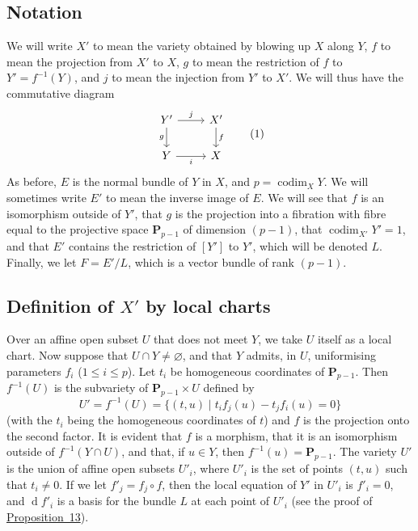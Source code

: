 \documentclass{article}
\newcommand{\PP}{\mathbf{P}}
\newcommand{\dd}{\operatorname{d}\!}
\renewcommand{\leq}{\leqslant}
\DeclareMathOperator{\codim}{codim}
\newcommand{\oldpage}[1]{\marginpar{\footnotesize$\Big\vert$ \textit{p.~#1}}}
\begin{document}
\subsection{Notation}
\label{section12a}

We will write $X'$ to mean the variety obtained by blowing up $X$ along $Y$, $f$ to mean the projection from $X'$ to $X$, $g$ to mean the restriction of $f$ to $Y'=f^{-1}(Y)$, and $j$ to mean the injection from $Y'$ to $X'$.
We will thus have the commutative diagram
\[
\label{section12aequation1}
  \begin{tikzcd}
    Y' \rar["j"] \dar[swap,"g"]
    & X' \dar["f"]
  \\ Y \rar[swap,"i"]
    & X
  \end{tikzcd}
  \tag{1}
\]
As before, $E$ is the normal bundle of $Y$ in $X$, and $p=\codim_XY$.
We will sometimes write $E'$ to mean the inverse image of $E$.
We will see that $f$ is an isomorphism outside of $Y'$, that $g$ is the projection into a fibration
\oldpage{126}
with fibre equal to the projective space $\PP_{p-1}$ of dimension $(p-1)$, that $\codim_{X'}Y'=1$, and that $E'$ contains the restriction of $[Y']$ to $Y'$, which will be denoted $L$.
Finally, we let $F=E'/L$, which is a vector bundle of rank $(p-1)$.


\subsection{Definition of \texorpdfstring{$X'$}{X'} by local charts}
\label{subsection12b}

Over an affine open subset $U$ that does not meet $Y$, we take $U$ itself as a local chart.
Now suppose that $U\cap Y\neq\varnothing$, and that $Y$ admits, in $U$, uniformising parameters $f_i$ ($1\leq i\leq p$).
Let $t_i$ be homogeneous coordinates of $\PP_{p-1}$.
Then $f^{-1}(U)$ is the subvariety of $\PP_{p-1}\times U$ defined by
\[
  U' = f^{-1}(U) = \big\{(t,u) \mid t_if_j(u)-t_jf_i(u)=0\big\}
\]
(with the $t_i$ being the homogeneous coordinates of $t$) and $f$ is the projection onto the second factor.
It is evident that $f$ is a morphism, that it is an isomorphism outside of $f^{-1}(Y\cap U)$, and that, if $u\in Y$, then $f^{-1}(u)=\PP_{p-1}$.
The variety $U'$ is the union of affine open subsets $U'_i$, where $U'_i$ is the set of points $(t,u)$ such that $t_i\neq 0$.
If we let $f'_j=f_j\circ f$, then the local equation of $Y'$ in $U'_i$ is $f'_i=0$, and $\dd f'_i$ is a basis for the bundle $L$ at each point of $U'_i$ (see the proof of \hyperref[proposition13]{Proposition~13}).
\end{document}
